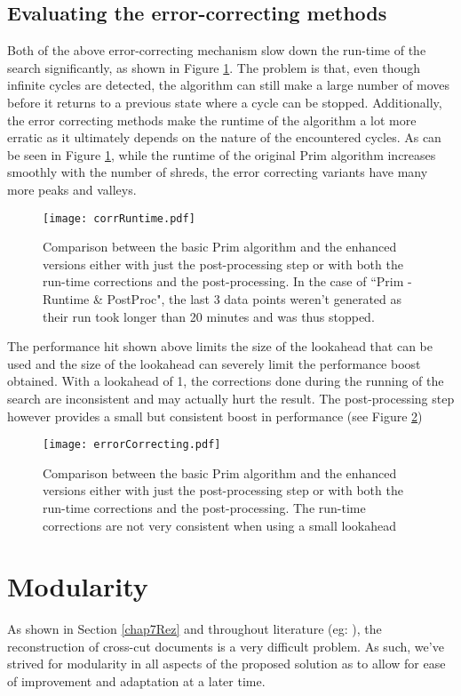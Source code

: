 \subsection{Evaluating the error-correcting methods}
Both of the above error-correcting mechanism slow down the run-time of the search significantly, as shown in Figure \ref{fig:corrScal}. The problem is that, even though infinite cycles are detected, the algorithm can still make a large number of moves before it returns to a previous state where a cycle can be stopped. Additionally, the error correcting methods make the runtime of the algorithm a lot more erratic as it ultimately depends on the nature of the encountered cycles. As can be seen in Figure \ref{fig:corrScal}, while the runtime of the original Prim algorithm increases smoothly with the number of shreds, the error correcting variants have many more peaks and valleys.
\begin{figure}[h]
  \centering
  \texttt{[image: corrRuntime.pdf]}
  \caption{Comparison between the basic Prim algorithm and the enhanced versions either with just the post-processing step or with both the run-time corrections and the post-processing. In the case of ``Prim - Runtime \& PostProc", the last 3 data points weren't generated as their run took longer than 20 minutes and was thus stopped.}
  \label{fig:corrScal}
\end{figure}

The performance hit shown above limits the size of the lookahead that can be used and the size of the lookahead can severely limit the performance boost obtained. With a lookahead of 1, the corrections done during the running of the search are inconsistent and may actually hurt the result. The post-processing step however provides a small but consistent boost in performance (see Figure \ref{fig:errorCorrecting})

\begin{figure}[h]
  \centering
  \texttt{[image: errorCorrecting.pdf]}
  \caption{Comparison between the basic Prim algorithm and the enhanced versions either with just the post-processing step or with both the run-time corrections and the post-processing. The run-time corrections are not very consistent when using a small lookahead}
  \label{fig:errorCorrecting}
\end{figure}

\section{Modularity}
\label{chap5Mod}
As shown in Section \ref{chap7Rez} and throughout literature (eg: \cite{P2,P7,P34}), the reconstruction of cross-cut documents is a very difficult problem. As such, we've strived for modularity in all aspects of the proposed solution as to allow for ease of improvement and adaptation at a later time. 


